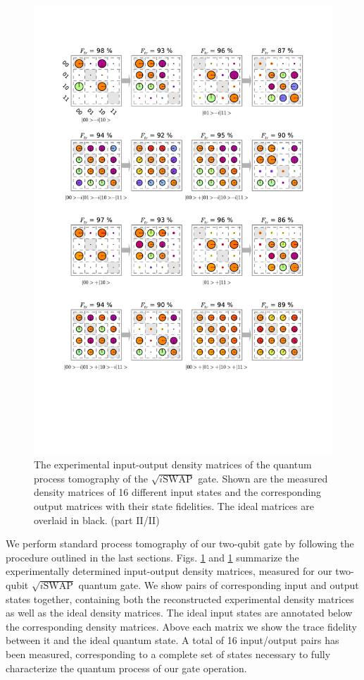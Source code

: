 \begin{figure}[p]
	\centering
		\includegraphics[width=1\textwidth]{"./data/ct5/2011_04_21 - grover and tomo/good_data/process -matrices 2"}
	\caption{The experimental input-output density matrices of the quantum process tomography of the $\sqrt{i\mathrm{SWAP}}$ gate. Shown are the measured density matrices of 16 different input states and the corresponding output matrices with their state fidelities. The ideal matrices are overlaid in black. (part II/II)}
	\label{fig:process_matrices_1}
\end{figure}

We perform standard process tomography of our two-qubit gate by following the procedure outlined in the last sections. Figs. \ref{fig:process_matrices_1} and \ref{fig:process_matrices_1} summarize the experimentally determined input-output density matrices, measured for our two-qubit $\sqrt{i\mathrm{SWAP}}$ quantum gate. We show pairs of corresponding input and output states together, containing both the reconstructed experimental density matrices as well as the ideal density matrices. The ideal input states are annotated below the corresponding density matrices. Above each matrix we show the trace fidelity between it and the ideal quantum state. A total of 16 input/output pairs has been measured, corresponding to a complete set of states necessary to fully characterize the quantum process of our gate operation.

